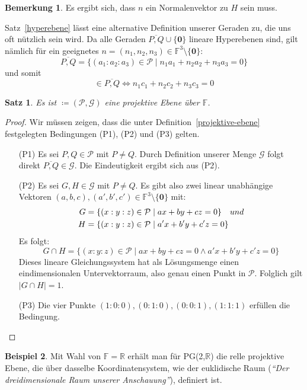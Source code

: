 \documentclass[hidelinks]{article}
\theoremstyle{plain}
\newtheorem{thm}{Satz}[section]
\theoremstyle{definition}
\newtheorem{bsp}[thm]{Beispiel}
\theoremstyle{rem}
\newtheorem*{remark}{Bemerkung}
\newcommand{\pgtwo}{PG(2, $\mathbb{F}$)\ }
\newcommand{\ftnz}{\mathbb{F}^{3}\setminus\{\boldsymbol 0\}}
\begin{document}
\begin{sloppypar}
\begin{remark}
Es ergibt sich, dass $n$ ein Normalenvektor zu $H$ sein muss.
\end{remark}
Satz~\ref{hyperebene} lässt eine alternative Definition unserer Geraden zu, die uns oft nützlich sein wird. Da alle Geraden $\overline{P,Q}\cup\{\boldsymbol 0\}$ lineare Hyperebenen sind, gilt nämlich für ein geeignetes \mbox{$n=(n_1,n_2,n_3)\in\ftnz$}:
\begin{equation*}
	\overline{P,Q}=\{(a_1:a_2:a_3)\in\mathcal{P}\mid n_1a_1+n_2a_2+n_3a_3=0\}
\end{equation*}
und somit
\begin{equation*}
	[c]\in\overline{P,Q}\Leftrightarrow n_1c_1+n_2c_2+n_3c_3=0
\end{equation*}

\begin{thm}
	Es ist \normalfont{\pgtwo}$\coloneqq(\mathcal{P},\mathcal{G})$ eine projektive Ebene über $\mathbb{F}$.
\end{thm}
\begin{proof}
	Wir müssen zeigen, dass die unter Definition~\ref{projektive-ebene} festgelegten Bedingungen (P1), (P2) und (P3) gelten.
\begin{enumerate}
	\item[(P1)] Es sei $P,Q\in\mathcal{P}$ mit $P\ne Q$. Durch Definition unserer Menge $\mathcal{G}$ folgt direkt $\overline{P,Q}\in\mathcal{G}$.
	Die Eindeutigkeit ergibt sich aus (P2).
	\item[(P2)] Es sei $G,H\in\mathcal{G}$ mit $P\ne Q$. Es gibt also zwei linear unabhängige Vektoren $(a,b,c),(a',b',c')\in\ftnz$ mit:
	\begin{align*}
	G & = \{(x:y:z)\in\mathcal{P}\mid ax+by+cz=0\}\quad\normalfont{und}\\
	H & =\{(x:y:z)\in\mathcal{P}\mid a'x+b'y+c'z=0\}
	\end{align*}
	Es folgt:
	\begin{equation*}
		G\cap H=\{(x:y:z)\in\mathcal{P}\mid ax+by+cz=0\land a'x+b'y+c'z=0\}
	\end{equation*}
	Dieses lineare Gleichungssystem hat als Lösungsmenge einen eindimensionalen Untervektorraum, also genau einen Punkt in $\mathcal{P}$. Folglich gilt $|G\cap H|=1$.
	\item[(P3)] Die vier Punkte $(1:0:0),(0:1:0),(0:0:1),(1:1:1)$ erfüllen die Bedingung.
\end{enumerate}
\end{proof}
\begin{bsp}
Mit Wahl von $\mathbb{F}=\mathbb{R}$ erhält man für PG(2,$\mathbb{R}$) die relle projektive Ebene, die über dasselbe Koordinatensystem, wie der euklidische Raum (\textit{``Der dreidimensionale Raum unserer Anschauung''}), definiert ist.\\

\end{bsp}
\end{sloppypar}
\end{document}
